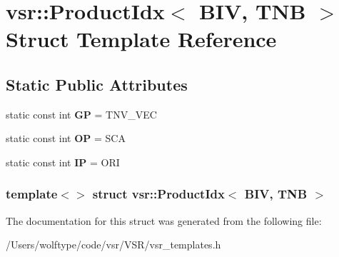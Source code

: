 \hypertarget{structvsr_1_1_product_idx_3_01_b_i_v_00_01_t_n_b_01_4}{\section{vsr\-:\-:Product\-Idx$<$ B\-I\-V, T\-N\-B $>$ Struct Template Reference}
\label{structvsr_1_1_product_idx_3_01_b_i_v_00_01_t_n_b_01_4}
}
\subsection*{Static Public Attributes}
\begin{DoxyCompactItemize}
\item 
\hypertarget{structvsr_1_1_product_idx_3_01_b_i_v_00_01_t_n_b_01_4_a907d64308a980337adcc76860f1f78ad}{static const int {\bfseries G\-P} = T\-N\-V\-\_\-\-V\-E\-C}\label{structvsr_1_1_product_idx_3_01_b_i_v_00_01_t_n_b_01_4_a907d64308a980337adcc76860f1f78ad}

\item 
\hypertarget{structvsr_1_1_product_idx_3_01_b_i_v_00_01_t_n_b_01_4_ab88ed8da26fa28e191587ed00170cd1f}{static const int {\bfseries O\-P} = S\-C\-A}\label{structvsr_1_1_product_idx_3_01_b_i_v_00_01_t_n_b_01_4_ab88ed8da26fa28e191587ed00170cd1f}

\item 
\hypertarget{structvsr_1_1_product_idx_3_01_b_i_v_00_01_t_n_b_01_4_a5e0903c0787ebdcfb6d1df79d8628c2f}{static const int {\bfseries I\-P} = O\-R\-I}\label{structvsr_1_1_product_idx_3_01_b_i_v_00_01_t_n_b_01_4_a5e0903c0787ebdcfb6d1df79d8628c2f}

\end{DoxyCompactItemize}
\subsubsection*{template$<$$>$ struct vsr\-::\-Product\-Idx$<$ B\-I\-V, T\-N\-B $>$}



The documentation for this struct was generated from the following file\-:\begin{DoxyCompactItemize}
\item 
/\-Users/wolftype/code/vsr/\-V\-S\-R/vsr\-\_\-templates.\-h\end{DoxyCompactItemize}
